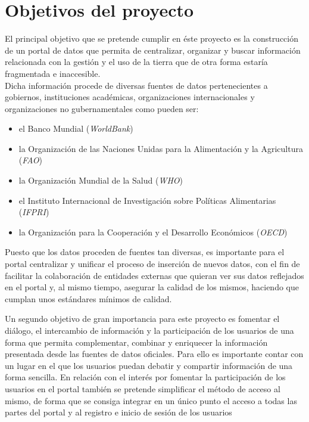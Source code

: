 {\section{Objetivos del proyecto}
\label{objetivos_proyecto}
El principal objetivo que se pretende cumplir en éste proyecto es la construcción de un portal de datos que permita de centralizar, organizar y buscar información relacionada con la gestión y el uso de la tierra que de otra forma estaría fragmentada e inaccesible.\\
Dicha información procede de diversas fuentes de datos pertenecientes a gobiernos, instituciones académicas, organizaciones internacionales y organizaciones no gubernamentales como pueden ser:
\begin{itemize}
\item el Banco Mundial (\textit{WorldBank})
\item la Organización de las Naciones Unidas para la Alimentación y la Agricultura (\textit{FAO})
\item la Organización Mundial de la Salud (\textit{WHO})
\item el Instituto Internacional de Investigación sobre Políticas Alimentarias (\textit{IFPRI})
\item la Organización para la Cooperación y el Desarrollo Económicos (\textit{OECD})
\end{itemize}
Puesto que los datos proceden de fuentes tan diversas, es importante para el portal centralizar y unificar el proceso de inserción de nuevos datos, con el fin de facilitar la colaboración de entidades externas que quieran ver sus datos reflejados en el portal y, al mismo tiempo, asegurar la calidad de los mismos, haciendo que cumplan unos estándares mínimos de calidad.

Un segundo objetivo de gran importancia para este proyecto es fomentar el diálogo, el intercambio de información y la participación de los usuarios de una forma que permita complementar, combinar y enriquecer la información presentada desde las fuentes de datos oficiales. Para ello es importante contar con un lugar en el que los usuarios puedan debatir y compartir información de una forma sencilla.\newline
En relación con el interés por fomentar la participación de los usuarios en el portal también se pretende simplificar el método de acceso al mismo, de forma que se consiga integrar en un único punto el acceso a todas las partes del portal y al registro e inicio de sesión de los usuarios

}
